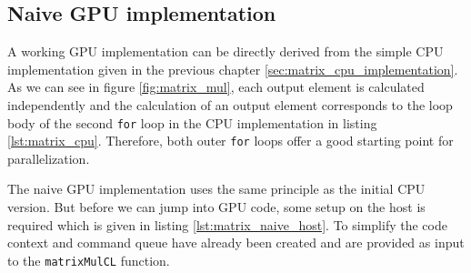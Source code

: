\subsection{Naive GPU implementation}
\label{sec:matrix_mul_naive}

A working GPU implementation can be directly derived from the simple CPU implementation given in the previous chapter \ref{sec:matrix_cpu_implementation}. As we can see in figure \ref{fig:matrix_mul}, each output element is calculated independently and the calculation of an output element corresponds to the loop body of the second \lstinline!for! loop in the CPU implementation in listing \ref{lst:matrix_cpu}. Therefore, both outer \lstinline!for! loops offer a good starting point for parallelization. 

The naive GPU implementation uses the same principle as the initial CPU version. But before we can jump into GPU code, some setup on the host is required which is given in listing \ref{lst:matrix_naive_host}. To simplify the code context and command queue have already been created and are provided as input to the \lstinline!matrixMulCL! function.



